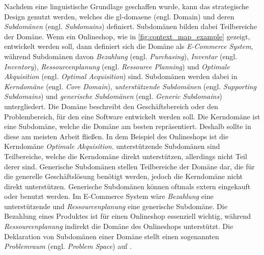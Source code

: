     Nachdem eine linguistische Grundlage geschaffen wurde, kann das strategische Design genutzt werden, welches die \gls{gl-domaene} (engl. Domain) und deren \emph{Subdomänen} (engl. \emph{Subdomains}) definiert. Subdomänen bilden dabei Teilbereiche der Domäne. Wenn ein Onlineshop, wie in \autoref{fig:context_map_example} gezeigt, entwickelt werden soll, dann definiert sich die Domäne als \emph{E-Commerce System}, während Subdomänen davon \emph{Bezahlung} (engl. \emph{Purchasing}), \emph{Inventar} (engl. \emph{Inventory}), \emph{Ressourcenplanung} (engl. \emph{Ressource Planning}) und \emph{Optimale Akquisition} (engl. \emph{Optimal Acquisition}) sind. Subdomänen werden dabei in \emph{Kerndomäne} (engl. \emph{Core Domain}), \emph{unterstützende Subdomänen} (engl. \emph{Supporting Subdomains}) und \emph{generische Subdomänen} (engl. \emph{Generic Subdomains}) untergliedert. Die Domäne beschreibt den Geschäftsbereich oder den Problembereich, für den eine Software entwickelt werden soll. Die Kerndomäne ist eine Subdomäne, welche die Domäne am besten repräsentiert. Deshalb sollte in diese am meisten Arbeit fließen. In dem Beispiel des Onlineshops ist die Kerndomäne \emph{Optimale Akquisition}. unterstützende Subdomänen sind Teilbereiche, welche die Kerndomäne direkt unterstützen, allerdings nicht Teil derer sind. Generische Subdomänen stellen Teilbereiche der Domäne dar, die für die generelle Geschäftslösung benötigt werden, jedoch die Kerndomäne nicht direkt unterstützen. Generische Subdomänen können oftmals extern eingekauft oder benutzt werden. Im E-Commerce System wäre \emph{Bezahlung} eine unterstützende und \emph{Ressourcenplanung} eine generische Subdomäne. Die Bezahlung eines Produktes ist für einen Onlineshop essenziell wichtig, während \emph{Ressourcenplanung} indirekt die Domäne des Onlineshops unterstützt. Die Deklaration von Subdomänen einer Domäne stellt einen sogenannten \emph{Problemraum} (engl. \emph{Problem Space}) auf \parencites[S. 402, S. 406]{evans2004domain}[S. 52,S. 56--58]{vernon2013implementing}{vernon2016domain}.

